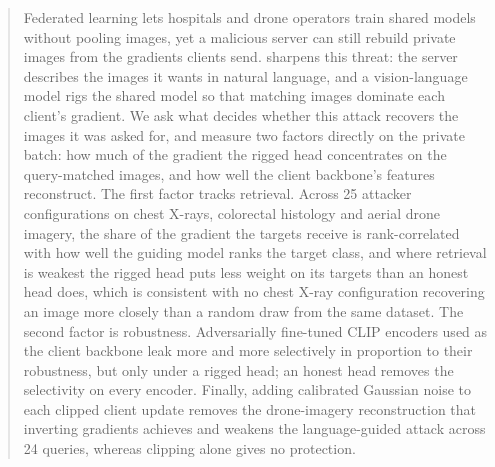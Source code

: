 \begin{abstract}
Federated learning lets hospitals and drone operators train shared models without pooling images, yet a malicious server can still rebuild private images from the gradients clients send.
\geminio sharpens this threat: the server describes the images it wants in natural language, and a vision-language model rigs the shared model so that matching images dominate each client's gradient.
We ask what decides whether this attack recovers the images it was asked for, and measure two factors directly on the private batch: how much of the gradient the rigged head concentrates on the query-matched images, and how well the client backbone's features reconstruct.
The first factor tracks retrieval. Across 25 attacker configurations on chest X-rays, colorectal histology and aerial drone imagery, the share of the gradient the targets receive is rank-correlated with how well the guiding model ranks the target class, and where retrieval is weakest the rigged head puts less weight on its targets than an honest head does, which is consistent with no chest X-ray configuration recovering an image more closely than a random draw from the same dataset.
The second factor is robustness. Adversarially fine-tuned CLIP encoders used as the client backbone leak more and more selectively in proportion to their robustness, but only under a rigged head; an honest head removes the selectivity on every encoder.
Finally, adding calibrated Gaussian noise to each clipped client update removes the drone-imagery reconstruction that inverting gradients achieves and weakens the language-guided attack across 24 queries, whereas clipping alone gives no protection.
\end{abstract}
